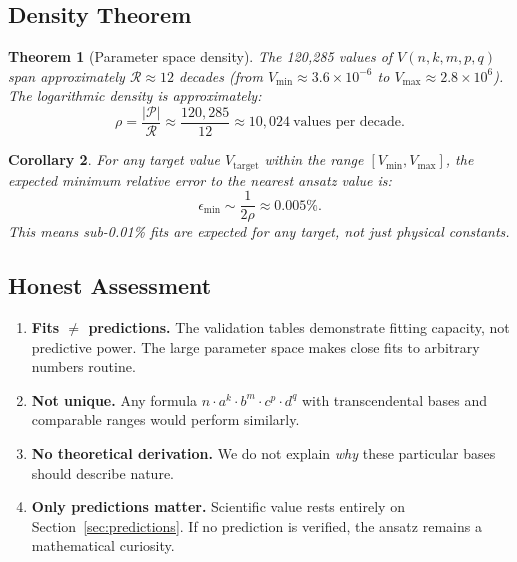 \documentclass[aps,prd,preprint,superscriptaddress,showpacs,nofootinbib,longbibliography]{revtex4-2}
\newtheorem{theorem}{Theorem}
\newtheorem{corollary}[theorem]{Corollary}
\begin{document}
\subsection{Density Theorem}

\begin{theorem}[Parameter space density]
\label{thm:density}
The 120,285 values of $V(n,k,m,p,q)$ span approximately $\mathcal{R} \approx 12$ decades (from $V_{\min} \approx 3.6 \times 10^{-6}$ to $V_{\max} \approx 2.8 \times 10^{6}$). The logarithmic density is approximately:
\begin{equation}
\rho = \frac{|\mathcal{P}|}{\mathcal{R}} \approx \frac{120{,}285}{12} \approx 10{,}024~\text{values per decade.}
\end{equation}
\end{theorem}

\begin{corollary}
For any target value $V_\text{target}$ within the range $[V_{\min}, V_{\max}]$, the expected minimum relative error to the nearest ansatz value is:
\begin{equation}
\epsilon_{\min} \sim \frac{1}{2\rho} \approx 0.005\%.
\end{equation}
This means sub-0.01\% fits are \emph{expected} for any target, not just physical constants.
\end{corollary}

\subsection{Honest Assessment}

\begin{enumerate}[itemsep=2pt]
    \item \textbf{Fits $\neq$ predictions.} The validation tables demonstrate fitting capacity, not predictive power. The large parameter space makes close fits to arbitrary numbers routine.
    \item \textbf{Not unique.} Any formula $n \cdot a^k \cdot b^m \cdot c^p \cdot d^q$ with transcendental bases and comparable ranges would perform similarly.
    \item \textbf{No theoretical derivation.} We do not explain \emph{why} these particular bases should describe nature.
    \item \textbf{Only predictions matter.} Scientific value rests entirely on Section~\ref{sec:predictions}. If no prediction is verified, the ansatz remains a mathematical curiosity.
\end{enumerate}
\end{document}
